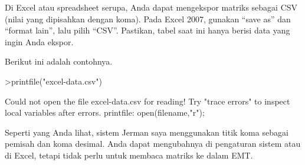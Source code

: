 \documentclass[a4paper,10pt]{article}
\begin{document}
\begin{eulernotebook}
\begin{eulercomment}
\begin{eulercomment}
\begin{eulercomment}
\begin{eulercomment}
\begin{eulercomment}
\begin{eulercomment}
\begin{eulercomment}
\begin{eulercomment}
\begin{eulercomment}
\begin{eulercomment}
\begin{eulercomment}
\begin{eulercomment}
\begin{eulercomment}
\begin{eulercomment}
\begin{eulercomment}
\begin{eulercomment}
\begin{eulercomment}
\begin{eulercomment}
\begin{eulercomment}
\begin{eulercomment}
\begin{eulercomment}
\begin{eulercomment}
\begin{eulercomment}
\begin{eulercomment}
\begin{eulercomment}
Di Excel atau spreadsheet serupa, Anda dapat mengekspor matriks
sebagai CSV (nilai yang dipisahkan dengan koma). Pada Excel 2007,
gunakan “save as” dan “format lain”, lalu pilih “CSV”. Pastikan, tabel
saat ini hanya berisi data yang ingin Anda ekspor.

Berikut ini adalah contohnya.
\end{eulercomment}
\begin{eulerprompt}
>printfile("excel-data.csv")
\end{eulerprompt}
\begin{euleroutput}
  Could not open the file
  excel-data.csv
  for reading!
  Try "trace errors" to inspect local variables after errors.
  printfile:
      open(filename,"r");
\end{euleroutput}
\begin{eulercomment}
Seperti yang Anda lihat, sistem Jerman saya menggunakan titik koma
sebagai pemisah dan koma desimal. Anda dapat mengubahnya di pengaturan
sistem atau di Excel, tetapi tidak perlu untuk membaca matriks ke
dalam EMT.


\end{eulercomment}
\end{eulercomment}
\end{eulercomment}
\end{eulercomment}
\end{eulercomment}
\end{eulercomment}
\end{eulercomment}
\end{eulercomment}
\end{eulercomment}
\end{eulercomment}
\end{eulercomment}
\end{eulercomment}
\end{eulercomment}
\end{eulercomment}
\end{eulercomment}
\end{eulercomment}
\end{eulercomment}
\end{eulercomment}
\end{eulercomment}
\end{eulercomment}
\end{eulercomment}
\end{eulercomment}
\end{eulercomment}
\end{eulercomment}
\end{eulercomment}
\end{eulernotebook}
\end{document}

